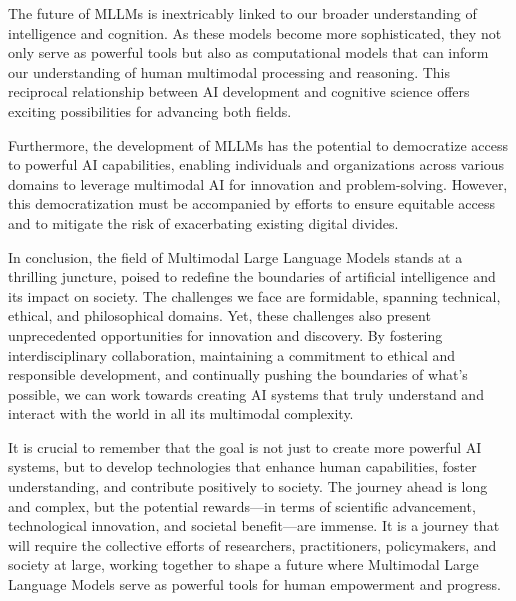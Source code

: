 The future of MLLMs is inextricably linked to our broader understanding of intelligence and cognition. As these models become more sophisticated, they not only serve as powerful tools but also as computational models that can inform our understanding of human multimodal processing and reasoning. This reciprocal relationship between AI development and cognitive science offers exciting possibilities for advancing both fields.

Furthermore, the development of MLLMs has the potential to democratize access to powerful AI capabilities, enabling individuals and organizations across various domains to leverage multimodal AI for innovation and problem-solving. However, this democratization must be accompanied by efforts to ensure equitable access and to mitigate the risk of exacerbating existing digital divides.

In conclusion, the field of Multimodal Large Language Models stands at a thrilling juncture, poised to redefine the boundaries of artificial intelligence and its impact on society. The challenges we face are formidable, spanning technical, ethical, and philosophical domains. Yet, these challenges also present unprecedented opportunities for innovation and discovery. By fostering interdisciplinary collaboration, maintaining a commitment to ethical and responsible development, and continually pushing the boundaries of what's possible, we can work towards creating AI systems that truly understand and interact with the world in all its multimodal complexity.

It is crucial to remember that the goal is not just to create more powerful AI systems, but to develop technologies that enhance human capabilities, foster understanding, and contribute positively to society. The journey ahead is long and complex, but the potential rewards—in terms of scientific advancement, technological innovation, and societal benefit—are immense. It is a journey that will require the collective efforts of researchers, practitioners, policymakers, and society at large, working together to shape a future where Multimodal Large Language Models serve as powerful tools for human empowerment and progress.




